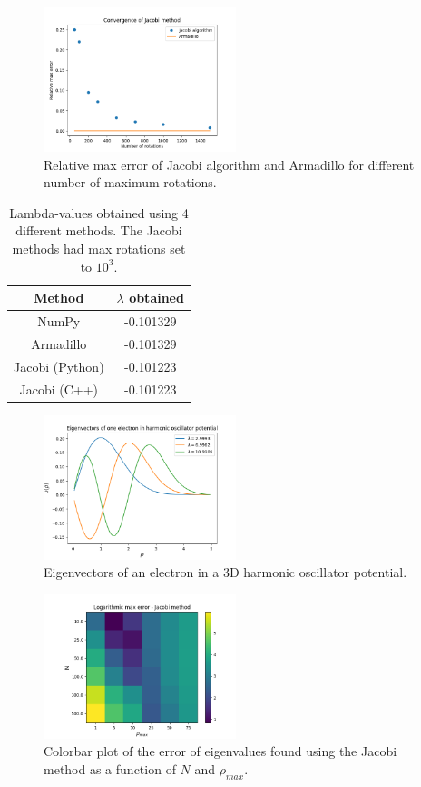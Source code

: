 \documentclass[notitlepage, reprint, nofootinbib]{revtex4-1}
\begin{document}
\begin{figure}[h!]
	\centering
	\includegraphics[width=0.5\textwidth]{../Figures/relative_max_error.png}
	\caption{Relative max error of Jacobi algorithm and Armadillo for different number of maximum rotations.}
	\label{relative_max_error}
\end{figure}
\begin{table}[h!]
\centering
\begin{tabular}{|c|c|}
\hline
Method & $\lambda$ obtained \\ \hline
NumPy & -0.101329 \\ \hline
Armadillo & -0.101329 \\ \hline
Jacobi (Python) & -0.101223 \\ \hline
Jacobi (C++) & -0.101223 \\ \hline
\end{tabular}
\caption{Lambda-values obtained using 4 different methods. The Jacobi methods had max rotations set to $10^3$.}
\label{lambdas}
\end{table}
\begin{figure}[h!]
	\centering
	\includegraphics[width=0.5\textwidth]{../Figures/eigvec_qdots1.png}
	\caption{Eigenvectors of an electron in a 3D harmonic oscillator potential.}
	\label{eigvec_qdots1}
\end{figure}
\begin{figure}[h!]
	\centering
	\includegraphics[width=0.5\textwidth]{../Figures/error_colorbar_qdots2.png}
	\caption{Colorbar plot of the error of eigenvalues found using the Jacobi method as a function of $N$ and $\rho_{max}$.}
	\label{qdots2}
\end{figure}
\end{document}
